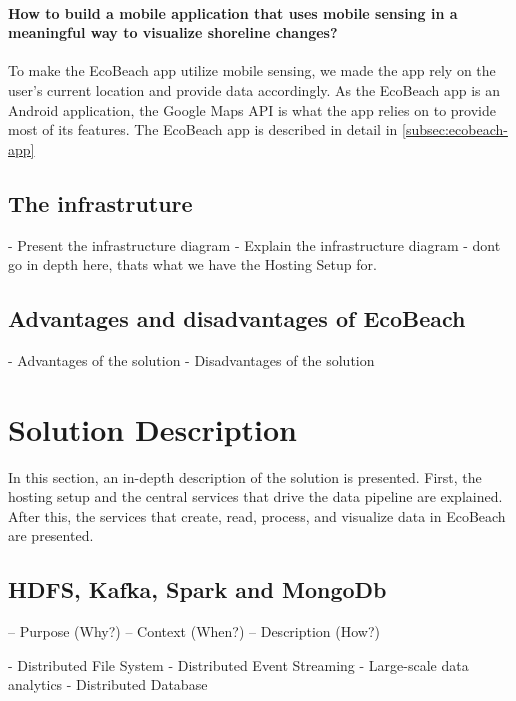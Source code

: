 \paragraph{How to build a mobile application that uses mobile sensing in a meaningful way to visualize shoreline changes?} To make the EcoBeach app utilize mobile sensing, we made the app rely on the user's current location and provide data accordingly. As the EcoBeach app is an Android application, the Google Maps API is what the app relies on to provide most of its features. The EcoBeach app is described in detail in \autoref{subsec:ecobeach-app}

\subsection{The infrastruture}\label{subsec:the-infrastructure}
- Present the infrastructure diagram
- Explain the infrastructure diagram
- dont go in depth here, thats what we have the Hosting Setup for.

\subsection{Advantages and disadvantages of EcoBeach}
- Advantages of the solution
- Disadvantages of the solution

\section{Solution Description}

In this section, an in-depth description of the solution is presented.  First, the hosting setup and the central services that drive the data pipeline are explained. After this, the services that create, read, process, and visualize data in EcoBeach are presented.

\subsection{HDFS, Kafka, Spark and MongoDb} \label{subsec:the-stack}

– Purpose (Why?)
– Context (When?)
– Description (How?)

- Distributed File System
- Distributed Event Streaming
- Large-scale data analytics
- Distributed Database

